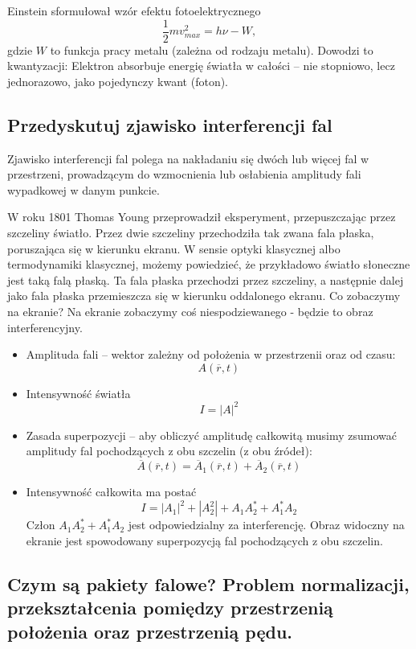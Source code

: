 Einstein sformułował wzór efektu fotoelektrycznego
\begin{equation*}
\frac12 m v_{max}^2 = h \nu - W,
\end{equation*}
gdzie $W$ to funkcja pracy metalu (zależna od rodzaju metalu). Dowodzi to kwantyzacji: Elektron absorbuje energię światła w całości – nie stopniowo, lecz jednorazowo, jako pojedynczy kwant (foton).

\subsection{Przedyskutuj zjawisko interferencji fal}

Zjawisko interferencji fal polega na nakładaniu się dwóch lub więcej fal w przestrzeni, prowadzącym do wzmocnienia lub osłabienia amplitudy fali wypadkowej w danym punkcie.

W roku 1801 Thomas Young przeprowadził eksperyment, przepuszczając przez szczeliny światło. Przez dwie szczeliny przechodziła tak zwana fala płaska, poruszająca się w kierunku ekranu. W sensie optyki klasycznej albo termodynamiki klasycznej, możemy powiedzieć, że przykładowo światło słoneczne jest taką falą płaską. Ta fala płaska przechodzi przez szczeliny, a następnie dalej jako fala płaska przemieszcza się w kierunku oddalonego ekranu. Co zobaczymy na ekranie? Na ekranie zobaczymy coś niespodziewanego - będzie to obraz interferencyjny.

\begin{itemize}
\item Amplituda fali -- wektor zależny od położenia w przestrzenii oraz od czasu: $$A(\overline{r}, t)$$
\item Intensywność światła
$$I = |A|^2$$
\item Zasada superpozycji -- aby obliczyć amplitudę całkowitą musimy zsumować amplitudy fal pochodzących z obu szczelin (z obu źródeł):
$$\overline{A}(\overline{r}, t) = \overline{A}_1(\overline{r}, t) + \overline{A}_2(\overline{r}, t)$$
\item Intensywność całkowita ma postać
$$I = |A_1|^2 + |A_2^2| + A_1 A_2^{*} + A_1^{*} A_2$$
Człon $A_1 A_2^{*} + A_1^{*} A_2$ jest odpowiedzialny za interferencję. Obraz widoczny na ekranie jest spowodowany superpozycją fal pochodzących z obu szczelin.
\end{itemize}

\subsection{Czym są pakiety falowe? Problem normalizacji, przekształcenia pomiędzy przestrzenią położenia oraz przestrzenią pędu.}

